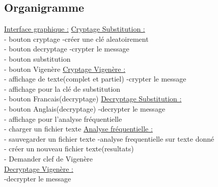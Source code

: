 \documentclass[a4]{article}
\begin{document}
		\subsection{Organigramme}
		\underline{Interface graphique :}     \hspace{5cm}  \underline{Cryptage Substitution :}\\
			- bouton cryptage            \hspace{5.5cm}       -créer une clé aleatoirement\\
			- bouton decryptage         \hspace{5cm}        -crypter le message\\
			- bouton substitution\\
			- bouton Vigenère           \hspace{5.2cm}       \underline{Cryptage Vigenère :}\\
			- affichage de texte(complet et partiel)  \hspace{2.2cm} -crypter le message\\
			- affichage pour la clé de substitution\\
			- bouton Francais(decryptage)   \hspace{3.5cm}     \underline{Decryptage Substitution :}\\
			- bouton Anglais(decryptage)    \hspace{3.5cm}     -decrypter le message\\
			- affichage pour l'analyse fréquentielle\\
			- charger un fichier texte       \hspace{4.2cm}  \underline{Analyse fréquentielle :}\\
			- sauvegarder un fichier texte     \hspace{3.8cm}  -analyse frequentielle sur texte donné\\
			- créer un nouveau fichier texte(resultats)\\
			- Demander clef de Vigenère\\
			
		\underline{Decryptage Vigenère :}\\
			-decrypter le message
		
		
\end{document}
